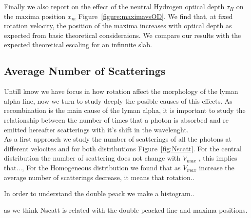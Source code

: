 \documentclass[usenatbib]{mn2e}
\newcommand{\kms}{\,km~s$^{-1}$}
\begin{document}





Finally we also report on the effect of the neutral Hydrogen
optical depth $\tau_{H}$ on the maxima position $x_{m}$
Figure~\ref{figure:maximavsOD}. We find that, at fixed
rotation velocity, the position of the maxima increases with optical
depth as expected from basic theoretical consideraions. We compare
our results with the expected theoretical escaling for an infinnite
slab. 




\subsection{Average Number of Scatterings}

Untill know we have focus in how rotation affect the morphology of the lyman alpha line, now we turn to study deeply the posible causes of this effects. As recombination is the main cause of the lyman alpha, it is important to study the relationship between the number of times that a photon is absorbed and re emitted hereafter scatterings with it's shift in the wavelenght. \\

As a first approach we study the number of scatterings of all the photons at different velocites and for both distributions Figure~\ref{fig:Nscatt}. For the central distribution the number of scattering does not change with $V_{max}$ , this implies that..., For the Homogeneous distribution we found that as $V_{max}$ increase the average number of scatterings decrease, it means that rotation..

In order to understand the double peack we make a histogram..   

as we think Nscatt is related with the double peacked line and maxima positions.
\end{document}
